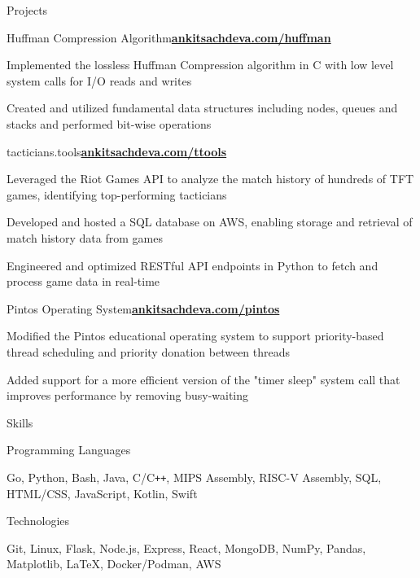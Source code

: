 \documentclass{resume}
\begin{document}
\begin{rSection}{\large Projects}

\begin{rSubsection}{Huffman Compression Algorithm}{\href{https://ankitsachdeva.com/huffman/}{\bf{{ankitsachdeva.com/huffman}}}}{}{}
\item Implemented the lossless Huffman Compression algorithm in C with low level system calls for I/O reads and writes
\item Created and utilized fundamental data structures including nodes, queues and stacks and performed bit-wise operations
\end{rSubsection}

\begin{rSubsection}{tacticians.tools}{\href{https://tacticians.tools/}{\bf{{ankitsachdeva.com/ttools}}}}{}{}
\item Leveraged the Riot Games API to analyze the match history of hundreds of TFT games, identifying top-performing tacticians
\item Developed and hosted a SQL database on AWS, enabling storage and retrieval of match history data from games
\item Engineered and optimized RESTful API endpoints in Python to fetch and process game data in real-time
\end{rSubsection}

\begin{rSubsection}{Pintos Operating System}{\href{http://ankitsachdeva.com/pintos/}{\bf{{ankitsachdeva.com/pintos}}}}{}{}
\item Modified the Pintos educational operating system to support priority-based thread scheduling and priority donation between threads
\item Added support for a more efficient version of the "timer sleep" system call that improves performance by removing busy-waiting
\end{rSubsection}

\end{rSection}

\begin{rSection}{\large Skills}

\begin{rSubsection}{Programming Languages}{}{}{}
\item Go, Python, Bash, Java, C/C{}\verb!++!, MIPS Assembly, RISC-V Assembly, SQL, HTML/CSS, JavaScript, Kotlin, Swift 
\end{rSubsection}

\begin{rSubsection}{Technologies}{}{}{}
\item Git, Linux, Flask, Node.js, Express, React, MongoDB, NumPy, Pandas, Matplotlib, LaTeX, Docker/Podman, AWS
\end{rSubsection}
\end{rSection}
\end{document}
